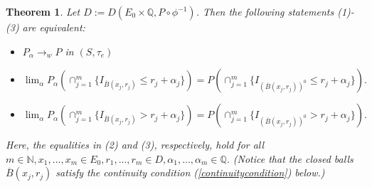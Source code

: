 \documentclass[sn-mathphys,Numbered]{sn-jnl}%
\theoremstyle{thmstyleone}%
\newtheorem{theorem}{Theorem}%
\theoremstyle{thmstyletwo}%
\theoremstyle{thmstylethree}%
\begin{document}
\begin{theorem} \label{sufficient} Let $D:=D(E_0 \times \mathbb{Q},P \circ \phi^{-1})$. Then the following statements (1)-(3) are equivalent:
\begin{itemize}
\item[(1)] $P_\alpha \rightarrow_w P$ in $(S,\tau_e)$
\item[(2)] $\lim_\alpha P_\alpha(\cap_{j=1}^m \{I_{\overline{B}(x_j,r_j)} \le r_j+\alpha_j\}) = P(\cap_{j=1}^m \{I_{(\overline{B}(x_j,r_j))^0} \le r_j+ \alpha_j\}).$
\item[(3)] $\lim_\alpha P_\alpha(\cap_{j=1}^m \{I_{\overline{B}(x_j,r_j)} > r_j+\alpha_j\}) = P(\cap_{j=1}^m \{I_{(\overline{B}(x_j,r_j))^0} > r_j+ \alpha_j\}).$
\end{itemize}
Here, the equalities in (2) and (3), respectively, hold for all
$m \in \mathbb{N}, x_1,\ldots,x_m \in E_0, r_1,\ldots,r_m \in D, \alpha_1,\ldots,\alpha_m \in \mathbb{Q}.$ (Notice that the closed balls
$\overline{B}(x_j,r_j)$ satisfy the continuity condition (\ref{continuitycondition}) below.)
\end{theorem}
\end{document}
